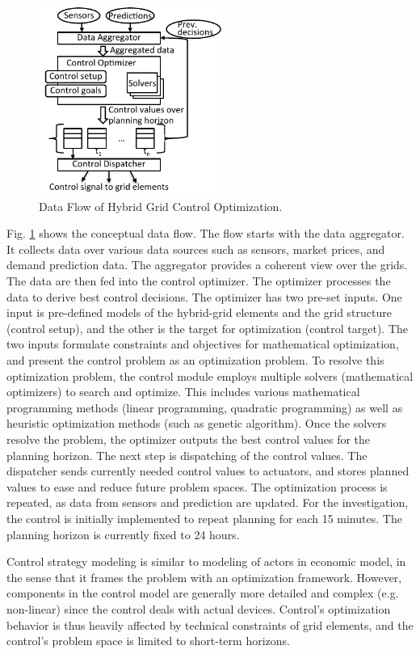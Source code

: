 \documentclass[review]{elsarticle}
\begin{document}
\begin{figure}[t]
  \centering
  \includegraphics[width=60mm]{figures/control_flow.pdf}
  \caption{Data Flow of Hybrid Grid Control Optimization.}
  \label{fig:control}
\end{figure}
Fig. \ref{fig:control} shows the conceptual data flow. 
The flow starts with the data  aggregator. It collects data
over various data sources such as sensors, market prices, and demand 
prediction data. 
The aggregator provides a coherent view over the  grids.  
The data are then fed into the control optimizer. The optimizer
processes the data to derive best control decisions. 
The optimizer has two pre-set inputs. One input is pre-defined models
of the hybrid-grid elements and the grid structure (control setup),
and the other is the target for optimization (control target). 
The two inputs formulate constraints and objectives for mathematical
optimization, and present the control problem as an optimization
problem. 
To resolve this optimization problem, the control module employs
multiple solvers (mathematical optimizers) to search and optimize.
This includes various mathematical  programming methods (linear
programming, quadratic programming) as well as heuristic optimization
methods (such as genetic algorithm). 
Once the solvers resolve the problem, the optimizer outputs the
best control values for the planning horizon. 
The next step is dispatching of the control values. The dispatcher
sends currently needed control values to actuators, and stores
planned values to ease and reduce future problem spaces. The
optimization process is repeated, as data from sensors and prediction
are updated. For the investigation, the control is initially
implemented to repeat planning for each 15 minutes. The planning
horizon is currently fixed to 24 hours. 

Control strategy modeling is similar to modeling of actors in 
economic model, in the sense that it frames the problem with
an optimization framework. However, components in the control model
are generally more detailed and complex (e.g. non-linear) since the 
control deals with actual devices. Control's optimization behavior is 
thus heavily affected by technical constraints of grid
elements, and the control's problem space is limited to short-term
horizons. %
\end{document}
